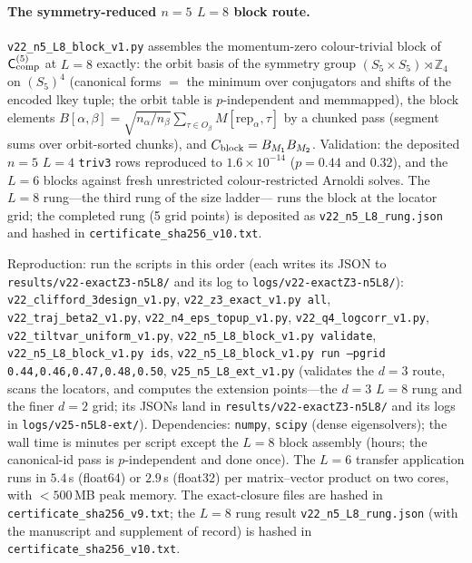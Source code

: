 \documentclass[aps,prx,reprint,superscriptaddress,nobibnotes,longbibliography]{revtex4-2}
\newcommand{\Ccomp}{\mathsf C_{\rm comp}}
\begin{document}
\paragraph{The symmetry-reduced $n=5$ $L=8$ block route.}
\texttt{v22\_n5\_L8\_block\_v1.py} assembles the momentum-zero
colour-trivial block of $\Ccomp^{(5)}$ at $L=8$ exactly: the orbit basis
of the symmetry group $(S_5\times S_5)\rtimes\mathbb Z_4$ on
$(S_5)^4$ (canonical forms $=$ the minimum over conjugators and shifts of
the encoded lkey tuple; the orbit table is $p$-independent and
memmapped), the block elements
$B[\alpha,\beta]=\sqrt{n_\alpha/n_\beta}\sum_{\tau\in O_\beta}
M[\mathrm{rep}_\alpha,\tau]$ by a chunked pass (segment sums over
orbit-sorted chunks), and $C_{\rm block}=B_{M_1}B_{M_2}$.  Validation:
the deposited $n=5$ $L=4$ \texttt{triv3} rows reproduced to
$1.6\times10^{-14}$ ($p=0.44$ and $0.32$), and the $L=6$ blocks against
fresh unrestricted colour-restricted Arnoldi solves.  The $L=8$ rung---the third rung of the size ladder---
runs the block at the locator grid; the completed rung (5 grid
points) is deposited as \texttt{v22\_n5\_L8\_rung.json} and hashed in
\texttt{certificate\_sha256\_v10.txt}.

Reproduction: run the scripts in this order (each writes its JSON to
\texttt{results/v22-exactZ3-n5L8/} and its log to
\texttt{logs/v22-exactZ3-n5L8/}): \texttt{v22\_clifford\_3design\_v1.py},
\texttt{v22\_z3\_exact\_v1.py all},
\texttt{v22\_traj\_beta2\_v1.py},
\texttt{v22\_n4\_eps\_topup\_v1.py},
\texttt{v22\_q4\_logcorr\_v1.py},
\texttt{v22\_tiltvar\_uniform\_v1.py},
\texttt{v22\_n5\_L8\_block\_v1.py validate},
\texttt{v22\_n5\_L8\_block\_v1.py ids},
\texttt{v22\_n5\_L8\_block\_v1.py run --pgrid 0.44,0.46,0.47,0.48,0.50},
\texttt{v25\_n5\_L8\_ext\_v1.py} (validates the $d=3$ route, scans the locators,
and computes the extension points---the $d=3$ $L=8$ rung and the finer $d=2$
grid; its JSONs land in \texttt{results/v22-exactZ3-n5L8/} and its logs in
\texttt{logs/v25-n5L8-ext/}).
Dependencies: \texttt{numpy}, \texttt{scipy} (dense eigensolvers); the
wall time is minutes per script except the $L=8$ block assembly (hours;
the canonical-id pass is $p$-independent and done once).  The $L=6$
transfer application runs in $5.4$\,s (float64) or $2.9$\,s (float32)
per matrix--vector product on two cores, with $<500$\,MB peak memory.  The exact-closure files are hashed in
\texttt{certificate\_sha256\_v9.txt}; the $L=8$ rung result
\texttt{v22\_n5\_L8\_rung.json} (with the manuscript and supplement of
record) is hashed in \texttt{certificate\_sha256\_v10.txt}.
\end{document}

